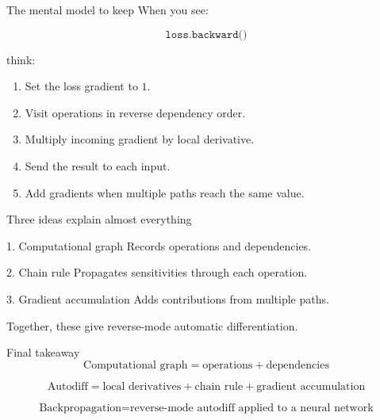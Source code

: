 \documentclass[10pt,aspectratio=169]{beamer}
\newcommand{\adj}[1]{\bar{#1}}
\begin{document}


\begin{frame}[t]{The mental model to keep}
When you see:

\[
\texttt{loss.backward()}
\]

think:

\begin{enumerate}
    \item Set the loss gradient to \(1\).
    \item Visit operations in reverse dependency order.
    \item Multiply incoming gradient by local derivative.
    \item Send the result to each input.
    \item Add gradients when multiple paths reach the same value.
\end{enumerate}
\end{frame}

\begin{frame}[t]{Three ideas explain almost everything}
\begin{block}{1. Computational graph}
Records operations and dependencies.
\end{block}

\begin{block}{2. Chain rule}
Propagates sensitivities through each operation.
\end{block}

\begin{block}{3. Gradient accumulation}
Adds contributions from multiple paths.
\end{block}

\vfill

Together, these give reverse-mode automatic differentiation.
\end{frame}

\begin{frame}[t]{Final takeaway}
\[
\boxed{
\text{Computational graph}
=
\text{operations}
+
\text{dependencies}
}
\]

\vspace{0.25cm}

\[
\boxed{
\text{Autodiff}
=
\text{local derivatives}
+
\text{chain rule}
+
\text{gradient accumulation}
}
\]

\vspace{0.25cm}

\[
\boxed{
\text{Backpropagation}
=
\text{reverse-mode autodiff applied to a neural network}
}
\]
\end{frame}
\end{document}
